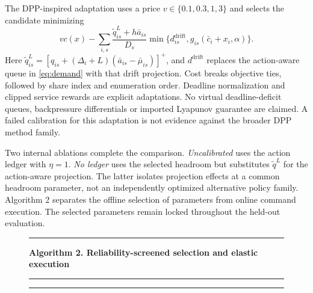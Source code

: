 \documentclass{IEEEoj}
\newcommand{\algline}[3]{\node[anchor=west,align=left,text width=\dimexpr\linewidth-#2cm-25pt\relax,font=\fontsize{8.5}{10}\selectfont,text=black,inner xsep=2pt] at (#2,-.48*#1) {#3};\node[anchor=east,font=\scriptsize\sffamily,text=black!55] at (-.17,-.48*#1) {#1}}
\begin{document}
The DPP-inspired adaptation uses a price $v\in\{0.1,0.3,1,3\}$ and selects
the candidate minimizing
\begin{equation}
 v c(x)-\sum_{i,s}\frac{\widetilde q^{L}_{is}+h\bar a_{is}}{D_s}
       \min\{d^{\mathrm{drift}}_{is},g_{is}(\bar c_i+x_i,\alpha)\}.
 \label{eq:dpp}
\end{equation}
Here $\widetilde q^{L}_{is}=[q_{is}+(\Delta_i+L)(\bar a_{is}-\bar\mu_{is})]^+$,
and $d^{\mathrm{drift}}$ replaces the action-aware queue in
\eqref{eq:demand} with that drift projection. Cost breaks objective ties,
followed by share index and enumeration order. Deadline normalization and
clipped service rewards are explicit adaptations. No virtual deadline-deficit
queues, backpressure differentials or imported Lyapunov guarantee are claimed.
A failed calibration for this adaptation is not evidence against the broader
DPP method family.

Two internal ablations complete the comparison. \emph{Uncalibrated} uses the
action ledger with $\eta=1$. \emph{No ledger} uses the selected headroom but
substitutes $\widetilde q^{L}$ for the action-aware projection. The latter
isolates projection effects at a common headroom parameter, not an independently
optimized alternative policy family. Algorithm 2 separates the offline
selection of parameters from online command execution. The selected parameters
remain locked throughout the held-out evaluation.

\begin{figure}[htbp]\centering
\begin{minipage}{.96\linewidth}
\hrule\smallskip %
\textbf{Algorithm 2. Reliability-screened selection and elastic execution}\par\smallskip\hrule\smallskip
\noindent{}\hrule
\end{minipage}
\end{figure}
\end{document}
